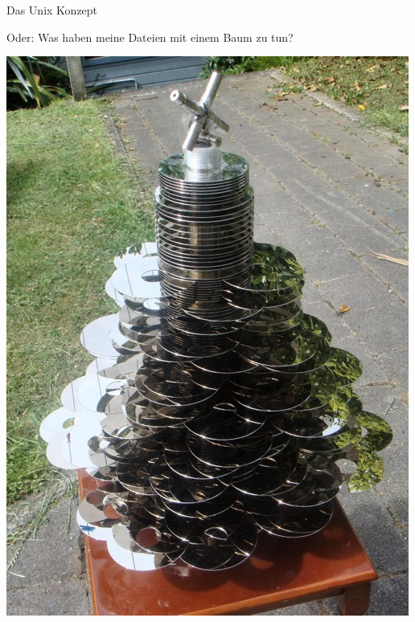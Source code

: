 \begin{frame}{Das Unix Konzept}
\begin{center}
Oder: Was haben meine Dateien mit einem Baum zu tun?

\vspace{0.1cm}
\includegraphics[scale=0.2]{img/harddisk-christmas-tree1} 
\end{center}
\end{frame}